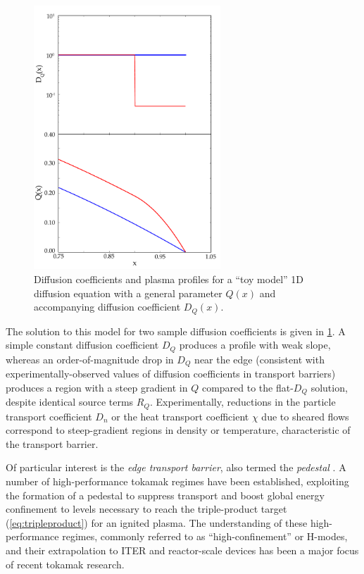  \begin{figure}
  \includegraphics[width=70mm]{graphics/Introduction/transport.pdf}
  \caption[Diffusion coefficients and plasma profiles for a ``toy model'' diffusion equation.]{Diffusion coefficients and plasma profiles for a ``toy model'' 1D diffusion equation with a general parameter $Q(x)$ and accompanying diffusion coefficient $D_Q(x)$.}
  \label{fig:intro_transport}
 \end{figure}

\noindent The solution to this model for two sample diffusion coefficients is given in \cref{fig:intro_transport}.  A simple constant diffusion coefficient $D_Q$ produces a profile with weak slope, whereas an order-of-magnitude drop in $D_Q$ near the edge (consistent with experimentally-observed values of diffusion coefficients in transport barriers) produces a region with a steep gradient in $Q$ compared to the flat-$D_Q$ solution, despite identical source terms $R_Q$.  Experimentally, reductions in the particle transport coefficient $D_n$ or the heat transport coefficient $\chi$ due to sheared flows correspond to steep-gradient regions in density or temperature, characteristic of the transport barrier.

Of particular interest is the \emph{edge transport barrier}, also termed the \emph{pedestal} \cite{Wagner1982,Greenwald1997}.  A number of high-performance tokamak regimes have been established, exploiting the formation of a pedestal to suppress transport and boost global energy confinement to levels necessary to reach the triple-product target (\cref{eq:tripleproduct}) for an ignited plasma.  The understanding of these high-performance regimes, commonly referred to as ``high-confinement'' or H-modes, and their extrapolation to ITER and reactor-scale devices has been a major focus of recent tokamak research.


